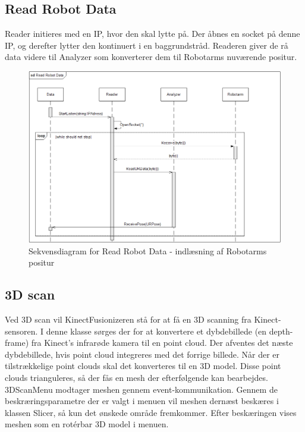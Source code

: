 {\subsection{Read Robot Data} 
Reader initieres med en IP, hvor den skal lytte på. 
Der åbnes en socket på denne IP, og derefter lytter den kontinuert i en baggrundstråd. 
Readeren giver de rå data videre til Analyzer som konverterer dem til Robotarms nuværende positur.

\begin{figure}[H]
    \centering
    \includegraphics[width=1\textwidth]{figurer/d/Design/Sequence/sd_reading}
    \caption{Sekvensdiagram for Read Robot Data - indlæsning af Robotarms positur}
    \label{sd_reading}
\end{figure}

\subsection{3D scan}
Ved 3D scan vil KinectFusionizeren stå for at få en 3D scanning fra Kinect-sensoren. I denne klasse sørges der for at konvertere et dybdebillede (en depth-frame) fra Kinect's infrarøde kamera til en point cloud. Der afventes det næste dybdebillede, hvis point cloud integreres med det forrige billede. Når der er tilstrækkelige point clouds skal det konverteres til en 3D model.  Disse point clouds trianguleres, så der fås en mesh der efterfølgende kan bearbejdes. 3DScanMenu modtager meshen gennem event-kommunikation.
Gennem de beskræringsparametre der er valgt i menuen vil meshen dernæst beskæres i klassen Slicer, så kun det ønskede område fremkommer. Efter beskæringen vises meshen som en rotérbar 3D model i menuen.

}
